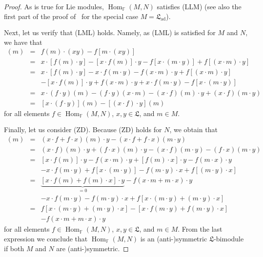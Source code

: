 \documentclass{jonasart}
\DeclareMathOperator{\ad}{ad}
\DeclareMathOperator{\Hom}{Hom}
\newcommand{\fbb}{\mathbb{F}}
\newcommand{\lf}{\mathfrak{L}}
\begin{document}
	\begin{proof}
		As is true for Lie modules, $\Hom_\fbb(M,N)$ satisfies \textrm{(LLM)} (see also the first part of the proof of~\cite[Lemma 1.4\,(b)]{FW1} for the special case $M=\lf_{\ad}$).

		Next, let us verify that (LML) holds. Namely, as (LML) is satisfied for $M$
		and $N$, we have that
		\begin{eqnarray*}
			[f\cdot(xy)]
			(m) & = & f(m)\cdot(xy)-f[m\cdot(xy)]\\
			& = & x\cdot[f(m)\cdot y]-[x\cdot f(m)]\cdot y-f[x\cdot(m\cdot y)]+f[(x\cdot m)\cdot y]\\
			& = & x\cdot[f(m)\cdot y]-x\cdot f(m\cdot y)-f(x\cdot m)\cdot y+f[(x\cdot m)\cdot y]\\
			&& -[x\cdot f(m)]\cdot y+f(x\cdot m)\cdot y+x\cdot f(m\cdot y)-f[x\cdot(m\cdot y)]\\
			& = & x\cdot(f\cdot y)(m)-(f\cdot y)(x\cdot m)-(x\cdot f)(m)\cdot y+(x\cdot f)(m\cdot y)\\
			& = & [x\cdot(f\cdot y)](m)-[(x\cdot f)\cdot y](m)
		\end{eqnarray*}
		for all elements $f\in\Hom_\fbb(M,N)$, $x,y\in\lf$, and $m\in M$.

		Finally, let us consider (ZD). Because (ZD) holds for $N$, we obtain that
		\begin{eqnarray*}
			[(x\cdot f+f\cdot x)\cdot y]
			(m) & = & (x\cdot f+f\cdot x)(m)\cdot y
			-(x\cdot f+f\cdot x)(m\cdot y)\\
			& = & (x\cdot f)(m)\cdot y+(f\cdot x)(m)\cdot y-(x\cdot f)(m\cdot y)-(f\cdot x)(m\cdot y)\\
			& = & [x\cdot f(m)]\cdot y-f(x\cdot m)\cdot y+[f(m)\cdot x]\cdot y-f(m\cdot x)\cdot y\\
			&& -x\cdot f(m\cdot y)+f[x\cdot(m\cdot y)]-f(m\cdot y)\cdot x+f[(m\cdot y)\cdot x]\\
			& = & \underbrace{[x\cdot f(m)+f(m)\cdot x]\cdot y}_{=0}-f(x\cdot m+m\cdot x)\cdot y\\
			&& -x\cdot f(m\cdot y)-f(m\cdot y)\cdot x+f[x\cdot(m\cdot y)+(m\cdot y)\cdot x]\\
			& = & f[x\cdot(m\cdot y)+(m\cdot y)\cdot x]-[x\cdot f(m\cdot y)+f(m\cdot y)\cdot x]\\
			&& -f(x\cdot m+m\cdot x)\cdot y
		\end{eqnarray*}
		for all elements $f\in\Hom_\fbb(M,N)$, $x,y\in\lf$, and $m\in M$. From the last expression we conclude that $\Hom_\fbb(M,N)$ is an (anti-)symmetric
		$\lf$-bimodule if both $M$ and $N$ are (anti-)symmetric.
	\end{proof}
\end{document}
